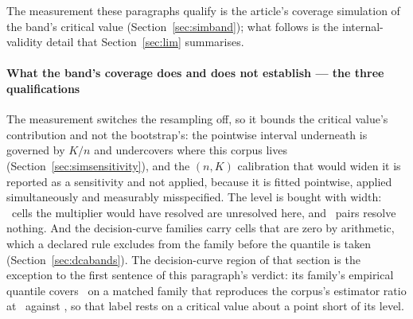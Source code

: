 
The measurement these paragraphs qualify is the article's coverage
simulation of the band's critical value (Section~\ref{sec:simband}); what
follows is the internal-validity detail that Section~\ref{sec:lim}
summarises.

\paragraph{What the band's coverage does and does not establish --- the three qualifications}
The measurement switches the resampling off, so it
bounds the critical value's contribution and not the bootstrap's: the
pointwise interval underneath is governed by $K/n$ and undercovers where
this corpus lives (Section~\ref{sec:simsensitivity}), and the $(n, K)$
calibration that would widen it is reported as a sensitivity and not
applied, because it is fitted pointwise, applied simultaneously and
measurably misspecified. The level is bought with width:
\nResolvedLostToEmp\ cells the multiplier would have resolved are unresolved
here, and \nUnresolvedPairs\ pairs resolve nothing. And the decision-curve
families carry cells that are zero by arithmetic, which a declared rule
excludes from the family before the quantile is taken
(Section~\ref{sec:dcabands}). The decision-curve region of that section is
the exception to the first sentence of this paragraph's verdict: its family's
empirical quantile covers \covEmpHeavyCaseAtDesign\ on a matched family that
reproduces the corpus's estimator ratio at \ratioSynthDca\ against
\ratioCorpusDca, so that label rests on a critical value about a point short
of its level.

